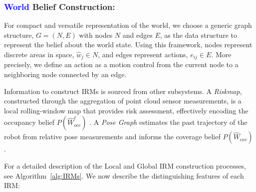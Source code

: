 \documentclass[letterpaper]{article} %
\newcommand{\ph}[1]{{\textbf{#1}:}} %
\begin{document}
\subsubsection{\textcolor{blue}{World} Belief Construction:} \hfill
\vspace{-0.25pt}

\noindent
For compact and versatile representation of the world, we choose a generic graph structure, $G = (N, E)$ with nodes $N$ and edges $E$, as the data structure to represent the belief about the world state. Using this framework, nodes represent discrete areas  in space, $\hat{w}_j \in N$, and edges represent actions, $e_{ij} \in E$. More precisely, we define an action as a motion control from the current node to a neighboring node connected by an edge. 

Information to construct IRMs is sourced from other subsystems. A \textit{Riskmap}, constructed through the aggregation of point cloud sensor measurements, is a local rolling-window map that provides risk assessment, %
effectively encoding the occupancy belief $P(\hat{W}^\ell_{occ})$ \cite{fan2021step}.
A \textit{Pose Graph} %
estimates the past trajectory of the robot from relative pose measurements
and informs the coverage belief $P(\hat{W}_{cov})$ \cite{Ebadi2020}. 

For a detailed description of the Local and Global IRM construction processes, see Algorithm~\ref{alg:IRMs}. We now describe the distinguishing features of each IRM: 
\end{document}
